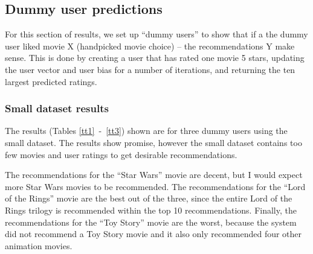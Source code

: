 \documentclass{article}
\begin{document}
\subsection{Dummy user predictions}
For this section of results, we set up ``dummy users'' to show that if a the dummy user liked movie X 
(handpicked movie choice) -- the recommendations Y make sense. This is done by creating a user that has rated
one movie 5 stars, updating the user vector and user bias for a number of iterations, 
and returning the ten largest predicted ratings.

\subsubsection{Small dataset results}
The results (Tables \ref{tt1}~-~\ref{tt3}) shown are for three dummy users using the small dataset. The 
results show promise, however the small dataset contains too few movies and user ratings to get desirable recommendations.

The recommendations for the ``Star Wars'' movie are decent, but I would
expect more Star Wars movies to be recommended. 
The recommendations for the ``Lord of the Rings'' movie are the best out of the three,
since the entire Lord of the Rings trilogy is recommended within the top 10 recommendations.
Finally, the recommendations for the ``Toy Story'' movie are the worst, because the system did not
recommend a Toy Story movie and it also only recommended four other animation movies. 

\begin{table}[h!]
    \centering
    \caption{Predictions for Star Wars: Episode II - Attack of the Clones (2002)}
    \label{tt1}
\end{table}
\end{document}
